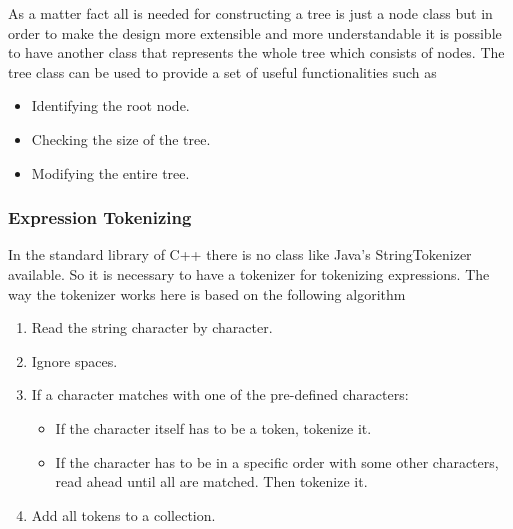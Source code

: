 \documentclass[10pt, a4paper, titlepage]{article}
\begin{document}
As a matter fact all is needed for constructing a tree is just a node class but in order to make the design more extensible and more understandable it is possible to have another class that represents the whole tree which consists of nodes. The tree class can be used to provide a set of useful functionalities such as 

\begin{itemize}
\item Identifying the root node.
\item Checking the size of the tree.
\item Modifying the entire tree.
\end{itemize}   

\subsubsection{Expression Tokenizing}
In the standard library of C++ there is no class like Java's StringTokenizer available. So it is necessary to have a tokenizer for tokenizing expressions. The way the tokenizer works here is based on the following algorithm

\begin{enumerate}
\item Read the string character by character.
\item Ignore spaces.
\item If a character matches with one of the pre-defined characters:
\begin{itemize}
\item If the character itself has to be a token, tokenize it.
\item If the character has to be in a specific order with some other characters, read ahead until all are matched. Then tokenize it.
\end{itemize} 
\item Add all tokens to a collection.
\end{enumerate}
\end{document}

